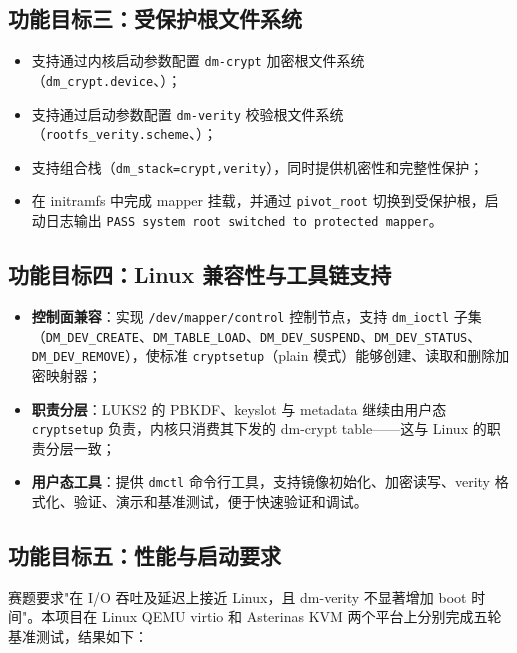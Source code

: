 \subsection{功能目标三：受保护根文件系统}

\begin{itemize}
    \item 支持通过内核启动参数配置 \texttt{dm-crypt} 加密根文件系统（\texttt{dm\_crypt.device}、\texttt{}）；
    \item 支持通过启动参数配置 \texttt{dm-verity} 校验根文件系统（\texttt{rootfs\_verity.scheme}、\texttt{}）；
    \item 支持组合栈（\texttt{dm\_stack=crypt,verity}），同时提供机密性和完整性保护；
    \item 在 initramfs 中完成 mapper 挂载，并通过 \texttt{pivot\_root} 切换到受保护根，启动日志输出 \texttt{PASS system root switched to protected mapper}。
\end{itemize}

\subsection{功能目标四：Linux 兼容性与工具链支持}

\begin{itemize}
    \item \textbf{控制面兼容}：实现 \texttt{/dev/mapper/control} 控制节点，支持 \texttt{dm\_ioctl} 子集（\texttt{DM\_DEV\_CREATE}、\texttt{DM\_TABLE\_LOAD}、\texttt{DM\_DEV\_SUSPEND}、\texttt{DM\_DEV\_STATUS}、\texttt{DM\_DEV\_REMOVE}），使标准 \texttt{cryptsetup}（plain 模式）能够创建、读取和删除加密映射器；
    \item \textbf{职责分层}：LUKS2 的 PBKDF、keyslot 与 metadata 继续由用户态 \texttt{cryptsetup} 负责，内核只消费其下发的 dm-crypt table——这与 Linux 的职责分层一致；
    \item \textbf{用户态工具}：提供 \texttt{dmctl} 命令行工具，支持镜像初始化、加密读写、verity 格式化、验证、演示和基准测试，便于快速验证和调试。
\end{itemize}

\subsection{功能目标五：性能与启动要求}

赛题要求"在 I/O 吞吐及延迟上接近 Linux，且 dm-verity 不显著增加 boot 时间"。本项目在 Linux QEMU virtio 和 Asterinas KVM 两个平台上分别完成五轮基准测试，结果如下：

